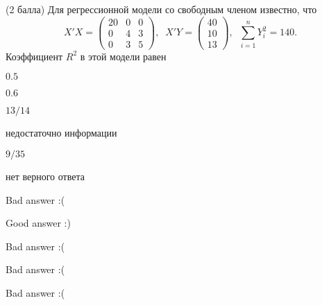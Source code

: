 
\begin{question}
(2 балла) Для регрессионной модели со свободным членом известно, что \[
X'X = \begin{pmatrix}
20 & 0 & 0 \\
0 & 4 & 3 \\
0 & 3 & 5
\end{pmatrix}, \; \;
X'Y = \begin{pmatrix}
40 \\
10 \\
13
\end{pmatrix}, \;\;
\sum_{i=1}^n Y_i^2 = 140.
\] Коэффициент \(R^2\) в этой модели равен
\begin{answerlist}
  \item \(0.5\)
  \item \(0.6\)
  \item \(13/14\)
  \item недостаточно информации
  \item \(9/35\)
  \item нет верного ответа
\end{answerlist}
\end{question}

\begin{solution}
\begin{answerlist}
  \item Bad answer :(
  \item Good answer :)
  \item Bad answer :(
  \item Bad answer :(
  \item Bad answer :(
\end{answerlist}
\end{solution}
